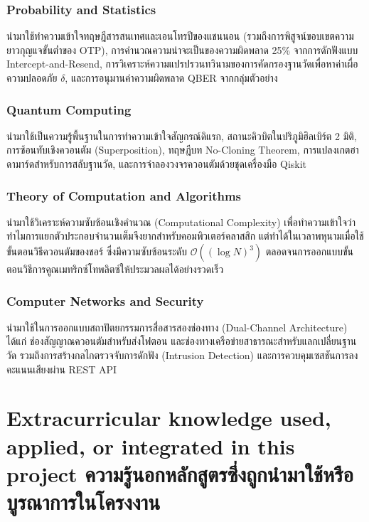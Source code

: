 \subsubsection{Probability and Statistics}
นำมาใช้ทำความเข้าใจทฤษฎีสารสนเทศและเอนโทรปีของแชนนอน (รวมถึงการพิสูจน์ขอบเขตความยาวกุญแจขั้นต่ำของ OTP), การคำนวณความน่าจะเป็นของความผิดพลาด 25\% จากการดักฟังแบบ Intercept-and-Resend, การวิเคราะห์ความแปรปรวนทวินามของการคัดกรองฐานวัดเพื่อหาค่าเผื่อความปลอดภัย $\delta$, และการอนุมานค่าความผิดพลาด QBER จากกลุ่มตัวอย่าง

\subsubsection{Quantum Computing}
นำมาใช้เป็นความรู้พื้นฐานในการทำความเข้าใจสัญกรณ์ดิแรก, สถานะคิวบิตในปริภูมิฮิลเบิร์ต 2 มิติ, การซ้อนทับเชิงควอนตัม (Superposition), ทฤษฎีบท No-Cloning Theorem, การแปลงเกตฮาดามาร์ดสำหรับการสลับฐานวัด, และการจำลองวงจรควอนตัมด้วยชุดเครื่องมือ Qiskit~\cite{qiskit2024}

\subsubsection{Theory of Computation and Algorithms}
นำมาใช้วิเคราะห์ความซับซ้อนเชิงคำนวณ (Computational Complexity) เพื่อทำความเข้าใจว่าทำไมการแยกตัวประกอบจำนวนเต็มจึงยากสำหรับคอมพิวเตอร์คลาสสิก แต่ทำได้ในเวลาพหุนามเมื่อใช้ขั้นตอนวิธีควอนตัมของชอร์ ซึ่งมีความซับซ้อนระดับ $\mathcal{O}((\log N)^3)$ ตลอดจนการออกแบบขั้นตอนวิธีการคูณเมทริกซ์โทพลิตซ์ให้ประมวลผลได้อย่างรวดเร็ว

\subsubsection{Computer Networks and Security}
นำมาใช้ในการออกแบบสถาปัตยกรรมการสื่อสารสองช่องทาง (Dual-Channel Architecture) ได้แก่ ช่องสัญญาณควอนตัมสำหรับส่งโฟตอน และช่องทางเครือข่ายสาธารณะสำหรับแลกเปลี่ยนฐานวัด รวมถึงการสร้างกลไกตรวจจับการดักฟัง (Intrusion Detection) และการควบคุมเซสชันการลงคะแนนเสียงผ่าน REST API

\section{\ifenglish%
Extracurricular knowledge used, applied, or integrated in this project
\else%
ความรู้นอกหลักสูตรซึ่งถูกนำมาใช้หรือบูรณาการในโครงงาน
\fi
}

